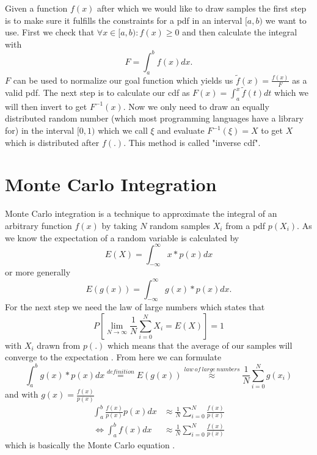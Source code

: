 Given a function $ f(x) $ after which we would like to draw samples the first step is to make sure
it fulfills the constraints for a pdf in an interval $ [a, b) $ we want to use.
First we check that $ \forall x \in [a, b): f(x) \geq 0 $ and then calculate the integral with
\begin{equation}
\label{eq:integral_fx}
    F = \int_{a}^b f(x) dx.
\end{equation}
$ F $ can be used to normalize our goal function which yields us $ \tilde{f}(x) = \frac{f(x)}{F} $ as a valid pdf.
The next step is to calculate our cdf as $ F(x) = \int_{a}^x \tilde{f}(t) dt $ which we will then invert to get $ F^{-1}(x) $.
Now we only need to draw an equally distributed random number (which most programming languages have a library for) in the interval $ [0, 1) $
which we call $ \xi $ and evaluate $ F^{-1}(\xi) = X $ to get $ X $ which is distributed after $ f(.) $.
This method is called "inverse cdf". \cite{pris}

\section{Monte Carlo Integration}
\label{sec:monte_carlo}

Monte Carlo integration is a technique to approximate the integral of an arbitrary function $ f(x) $
by taking $ N $ random samples $ X_i $ from a pdf $ p(X_i) $.
As we know the expectation of a random variable is calculated by $$ E(X) = \int_{-\infty}^\infty x * p(x) dx $$
or more generally $$ E(g(x)) = \int_{-\infty}^\infty g(x) * p(x) dx. $$
For the next step we need the law of large numbers which states that $$ P\left[ \lim_{N\to\infty} \frac{1}{N} \sum_{i = 0}^N X_i = E(X) \right] = 1 $$
with $ X_i $ drawn from $ p(.) $ which means that the average of our samples will converge to the expectation \cite[Chapter~2.4.1]{veach-thesis}.
From here we can formulate
\begin{equation*}
    \int_{a}^b g(x) * p(x) dx \stackrel{definition}{=} E(g(x))
    \stackrel{law~of~large~numbers}{\approx} \frac{1}{N} \sum_{i = 0}^N g(x_i)
\end{equation*}
and with $ g(x) = \frac{f(x)}{p(x)} $
\begin{equation*}
\begin{aligned}
    \int_{a}^b \frac{f(x)}{p(x)} p(x) dx &\approx \frac{1}{N} \sum_{i = 0}^N \frac{f(x)}{p(x)} \\
    \Leftrightarrow \int_{a}^b f(x) dx &\approx \frac{1}{N} \sum_{i = 0}^N \frac{f(x)}{p(x)}
\end{aligned}
\end{equation*}
which is basically the Monte Carlo equation \cite{pris}.

